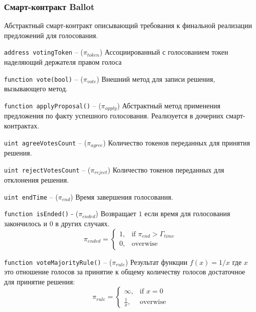 \documentclass[12pt]{report}
\def\code#1{\colorbox{light-gray}{\texttt{#1}}}
\begin{document}
\subsubsection{Смарт-контракт Ballot}
\label{tech-apps-voting-ballot}
\begin{multicols}{2}
Абстрактный смарт-контракт описывающий требования к финальной реализации предложений для голосования.

\code{address votingToken} – ($\pi_{token}$)\hfill\null\linebreak
Ассоциированный с голосованием токен наделяющий держателя правом голоса

\code{function vote(bool)} – ($\pi_{vote}$)\hfill\null\linebreak
Внешний метод для записи решения, вызывающего метод.

\code{function applyProposal()} – ($\pi_{apply}$)\hfill\null\linebreak
Абстрактный метод применения предложения по факту успешного голосования. Реализуется в дочерних смарт-контрактах.

\code{uint agreeVotesCount} – ($\pi_{agree}$)\hfill\null\linebreak
Количество токенов переданных для принятия решения.

\code{uint rejectVotesCount} – ($\pi_{reject}$)\hfill\null\linebreak
Количество токенов переданных для отклонения решения.

\code{uint endTime} – ($\pi_{end}$)\hfill\null\linebreak
Время завершения голосования.

\code{function isEnded()}  - ($\pi_{ended}$)\hfill\null\linebreak
Возвращает $1$ если время для голосования закончилось и $0$ в других случаях.
\begin{equation}
\pi_{ended} = \begin{cases}
	1, & \text{if } \pi_{end} > \Gamma_{time} \\
	0, & \text{overwise}
\end{cases}
\end{equation}

\code{function voteMajorityRule()} – ($\pi_{rule}$)\hfill\null\linebreak
Результат функции $f(x) = 1/x$ где $x$ это отношение голосов за принятие к общему количеству голосов достаточное для принятие решения:
\begin{equation}
\pi_{rule} = \begin{cases}
	\infty, & \text{if } x = 0 \\
	\frac{1}{x}, & \text{overwise}
\end{cases}
\end{equation}


\end{multicols}
\end{document}
